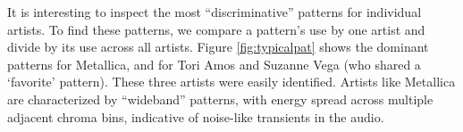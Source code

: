 \documentclass{article}
\begin{document}
It is interesting to inspect the most ``discriminative'' patterns for 
individual artists.  
To find these patterns, we compare a pattern's use by one artist and divide
by its use across all artists. Figure \ref{fig:typicalpat} 
shows the dominant patterns for Metallica, and for Tori Amos and
Suzanne Vega (who shared a `favorite' pattern). 
These three artists were easily identified.
Artists like Metallica are characterized by ``wideband'' patterns, 
with energy spread across multiple adjacent chroma bins, 
indicative of noise-like transients in the audio.

\end{document}
